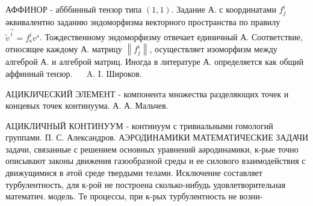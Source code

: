 \documentclass[10pt]{article}
\begin{document}
АФФИНОР - абббинный тензор типа $(1,1)$. Задание А. с координатами $f_{j}^{i}$ әквивалентно заданию эндоморфизма векторного пространства по правилу $\tilde{v}^{\vec{i}}=f_{\mathrm{s}}^{i} v^{s}$. Тождественному эндоморфизму отвечает единичный А. Соответствие, относящее каждому А. матрицу $\left\|f_{j}^{i}\right\|$, осуществляет изоморфизм между алгеброй А. и алгеброй матриц. Иногда в литературе А. определяется как общий аффинный тензор. $\quad$ A. I. Широков.



АЦИКЈИЧЕСКИЙ ЭЛЕМЕНТ - компонента множества разделяющих точек и концевых точек континуума. А. А. Мальчев.



АЦИКЛИЧНЫЙ КОНТИНУУМ - континуум с тривиальными гомологий группами. П. С. Александров. АЭРОДИНАМИКИ МАТЕМАТИЧЕСКИЕ ЗАДАЧИ задачи, связанные с решением основных уравнений аәродинамики, к-рые точно описывают законы движения газообразной среды и ее силового взаимодействия с движущимися в әтой среде твердыми телами. Исключение составляет турбулентность, для к-рой не построена сколько-нибудь удовлетворительная математич. модель. Те процессы, при к-рых турбулентность не возни-
\end{document}
